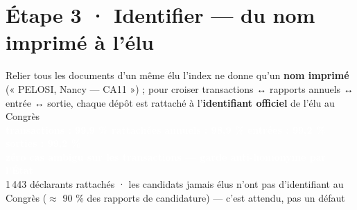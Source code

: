 \documentclass[11pt,aspectratio=169]{beamer}
\newcommand{\badge}[2]{\colorbox{#1}{\textcolor{white}{\footnotesize\textbf{#2}}}}
\begin{document}
\section{Étape 3 · Identifier — du nom imprimé à l'élu}
\begin{frame}{Relier tous les documents d'un même élu}
  \centering
  {\footnotesize l'index ne donne qu'un \textbf{nom imprimé} (« PELOSI, Nancy —
   CA11 ») ; pour croiser transactions ↔ rapports annuels ↔ entrée ↔ sortie,
   chaque dépôt est rattaché à l'\textbf{identifiant officiel} de l'élu au
   Congrès}\\[4mm]
  \badge{okgreen}{transactions : 99,9 \% rattachées}\;
  \badge{okgreen}{annuels : 98,9 \%}\;
  \badge{okgreen}{entrées : 99,2 \%}\;
  \badge{okgreen}{sorties : 99,2 \%}\\[2mm]
  \badge{okgreen}{zéro cas ambigu sur les transactions — garde anti-homonyme par l'État}\\[4mm]
  {\scriptsize\color{black!60} 1\,443 déclarants
   rattachés · les candidats jamais élus n'ont pas d'identifiant au Congrès
   ($\approx$ 90 \% des rapports de candidature) — c'est attendu, pas un défaut}
\end{frame}
\end{document}
